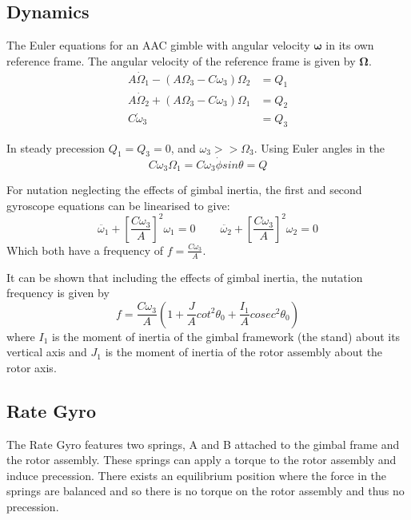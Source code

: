 \documentclass[8pt]{article}
\begin{document}
\subsection{Dynamics}

The Euler equations for an AAC gimble with angular velocity $\bm{\omega}$ in its own reference frame.
The angular velocity of the reference frame is given by $\bm{\Omega}$.
\begin{align}
    A\dot{\Omega}_1 - (A\Omega_3 - C \omega_3) \Omega_2 &= Q_1 \tag{A1}\\
    A\dot{\Omega}_2 + (A\Omega_3 - C\omega_3) \Omega_1 &= Q_2 \tag{A2} \\
    C\dot{\omega}_3 &= Q_3 \tag{A3}
\end{align}

In steady precession $Q_1 = Q_3 = 0$, and $\omega_3 >> \Omega_3$.
Using Euler angles in the 
\begin{equation}
    C\omega_3 \Omega_1 = C\omega_3 \dot{\phi} sin \theta = Q \tag{A4}
\end{equation}

For nutation neglecting the effects of gimbal inertia, the first and second gyroscope equations can be linearised to give:
\begin{equation}
    \ddot{\omega_1} + \left[ \frac{C\omega_3}{A} \right]^2 \omega_1 = 0 \;\;\;\;\;\;\;\; \ddot{\omega_2} + \left[ \frac{C\omega_3}{A} \right]^2 \omega_2 = 0 \tag{A5}
\end{equation}
Which both have a frequency of $ f = \frac{C\omega_3}{A} $.

It can be shown that including the effects of gimbal inertia, the nutation frequency is given by
\begin{equation}
    f = \frac{C\omega_3}{A} \left( 1 + \frac{J}{A}cot^2\theta_0 + \frac{I_1}{A}cosec^2\theta_0 \right) \tag{A7}
\end{equation}
where $I_1$ is the moment of inertia of the gimbal framework (the stand) about its vertical axis
and $J_1$ is the moment of inertia of the rotor assembly about the rotor axis.

\subsection{Rate Gyro}

The Rate Gyro features two springs, A and B attached to the gimbal frame and the rotor assembly.
These springs can apply a torque to the rotor assembly and induce precession.
There exists an equilibrium position where the force in the springs are balanced and so there is no torque on the rotor assembly and thus no precession.
\end{document}
